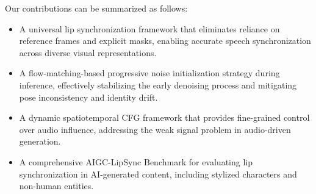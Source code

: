 Our contributions can be summarized as follows:
\begin{itemize}
\item[$\bullet$] A universal lip synchronization framework that eliminates reliance on reference frames and explicit masks, enabling accurate speech synchronization across diverse visual representations.

\item[$\bullet$] A flow-matching-based progressive noise initialization strategy during inference, effectively stabilizing the early denoising process and mitigating pose inconsistency and identity drift.

\item[$\bullet$] A dynamic spatiotemporal CFG framework that provides fine-grained control over audio influence, addressing the weak signal problem in audio-driven generation.

\item[$\bullet$] A comprehensive AIGC-LipSync Benchmark for evaluating lip synchronization in AI-generated content, including stylized characters and non-human entities.

\end{itemize}

